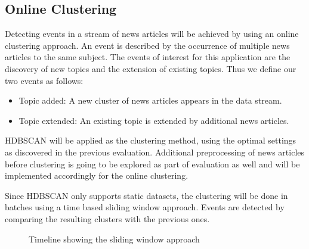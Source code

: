 \subsection{Online Clustering}

Detecting events in a stream of news articles will be achieved by using an online clustering approach. An event is described by the occurrence of multiple news articles to the same subject.  The events of interest for this application are the discovery of new topics and the extension of existing topics. Thus we define our two events as follows:

\begin{itemize}
    \item Topic added: A new cluster of news articles appears in the data stream.
    \item Topic extended: An existing topic is extended by additional news articles.
\end{itemize}

HDBSCAN will be applied as the clustering method, using the optimal settings as discovered in the previous evaluation. Additional preprocessing of news articles before clustering is going to be explored as part of evaluation as well and will be implemented accordingly for the online clustering.

Since HDBSCAN only supports static datasets, the clustering will be done in batches using a time based sliding window approach. Events are detected by comparing the resulting clusters with the previous ones.

\begin{figure}[h]
    \centering


    \caption{Timeline showing the sliding window approach}
    \label{fig:timeline}
\end{figure}

